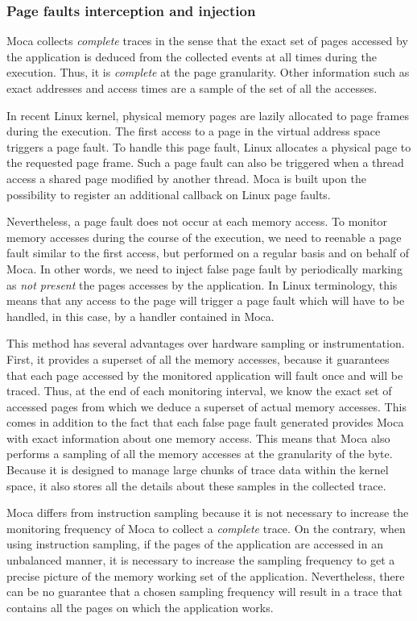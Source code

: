 \subsubsection{Page faults interception and injection}

\gls{Moca} collects \emph{complete} traces in the sense that the exact set of pages accessed by the application is deduced from the collected events at all times during the execution.
Thus, it is \emph{complete} at the page granularity.
Other information such as exact addresses and access times are a sample of the set of all the accesses.

In recent Linux kernel, physical memory pages are lazily allocated to page frames during the execution.
The first access to a page in the virtual address space triggers a page fault.
To handle this page fault, Linux allocates a physical page to the requested page frame.
Such a page fault can also be triggered when a thread access a shared page modified by another thread.
\gls{Moca} is built upon the possibility to register an additional callback on Linux page faults.

Nevertheless, a page fault does not occur at each memory access.
To monitor memory accesses during the course of the execution, we need to reenable a page fault similar to the first access, but performed on a regular basis and on behalf of \gls{Moca}.
In other words, we need to inject false page fault by periodically marking as \emph{not present} the pages accesses by the application.
In Linux terminology, this means that any access to the page will trigger a page fault which will have to be handled, in this case, by a handler contained in \gls{Moca}.

This method has several advantages over hardware sampling or instrumentation.
First, it provides a superset of all the memory accesses, because it guarantees that each page accessed by the monitored application will fault once and will be traced.
Thus, at the end of each monitoring interval, we know the exact set of accessed pages from which we deduce a superset of actual memory accesses.
This comes in addition to the fact that each false page fault generated provides \gls{Moca} with exact information about one memory access.
This means that \gls{Moca} also performs a sampling of all the memory accesses at the granularity of the byte.
Because it is designed to manage large chunks of trace data within the kernel space, it also stores all the details about these samples in the collected trace.

\gls{Moca} differs from instruction sampling because it is not necessary to increase the monitoring frequency of \gls{Moca} to collect a \emph{complete} trace.
On the contrary, when using instruction sampling, if the pages of the application are accessed in an unbalanced manner, it is necessary to increase the sampling frequency to get a precise picture of the memory working set of the application.
Nevertheless, there can be no guarantee that a chosen sampling frequency will result in a trace that contains all the pages on which the application works.

